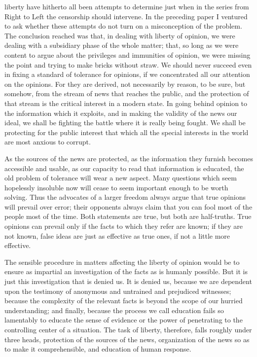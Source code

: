 \documentclass[openany,nobib,twoside,nohyper]{tufte-book}
\begin{document}
 liberty have hitherto all been attempts to determine
just when in the series from Right to Left the censorship should
intervene. In the preceding paper I ventured to ask whether these
attempts do not turn on a misconception of the problem. The conclusion
reached was that, in dealing with liberty of opinion, we were dealing
with a subsidiary phase of the whole matter; that, so long as we were
content to argue about the privileges and immunities of opinion, we were
missing the point and trying to make bricks without straw. We should
never succeed even in fixing a standard of tolerance for opinions, if we
concentrated all our attention on the opinions. For they are derived,
not necessarily by reason, to be sure, but somehow, from the stream of
news that reaches the public, and the protection of that stream is the
critical interest in a modern state. In going behind opinion to the
information which it exploits, and in making the validity of the news
our ideal, we shall be fighting the battle where it is really being
fought. We shall be protecting for the public interest that which all
the special interests in the world are most anxious to corrupt.

As the sources of the news are protected, as the information they
furnish becomes accessible and usable, as our capacity to read that
information is educated, the old problem of tolerance will wear a new
aspect. Many questions which seem hopelessly insoluble now will cease to
seem important enough to be worth solving. Thus the advocates of a
larger freedom always argue that true opinions will prevail over error;
their opponents always claim that you can fool most of the people most
of the time. Both statements are true, but both are half-truths. True
opinions can prevail only if the facts to which they refer are known; if
they are not known, false ideas are just as effective as true ones, if
not a little more effective.

The sensible procedure in matters affecting the liberty of opinion would
be to ensure as impartial an investigation of the facts as is humanly
possible. But it is just this investigation that is denied us. It is
denied us, because we are dependent upon the testimony of anonymous and
untrained and prejudiced witnesses; because the complexity of the
relevant facts is beyond the scope of our hurried understanding; and
finally, because the process we call education fails so lamentably to
educate the sense of evidence or the power of penetrating to the
controlling center of a situation. The task of liberty, therefore, falls
roughly under three heads, protection of the sources of the news,
organization of the news so as to make it comprehensible, and education
of human response.
\end{document}
